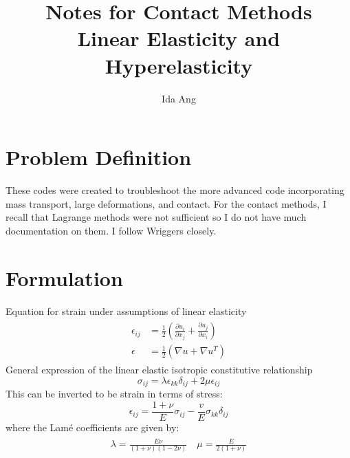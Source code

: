 \documentclass[12pt]{article}
\numberwithin{equation}{section}
\begin{document}
\title{Notes for Contact Methods \\
	\large{Linear Elasticity and Hyperelasticity}}
\author{Ida Ang}
\date{\vspace{-5ex}}
\maketitle

\tableofcontents
\newpage

\section{Problem Definition}
These codes were created to troubleshoot the more advanced code incorporating mass transport, large deformations, and contact. For the contact methods, I recall that Lagrange methods were not sufficient so I do not have much documentation on them. I follow Wriggers closely. 

\section{Formulation}
Equation for strain under assumptions of linear elasticity 
\begin{align}\label{Strain}
\begin{split}
\epsilon_{ij} &= \frac{1}{2} (\frac{\partial u_i}{\partial x_j} + \frac{\partial u_j}{\partial x_i}) \\
\epsilon &= \frac{1}{2} (\nabla u + \nabla u^T)
\end{split}
\end{align}
General expression of the linear elastic isotropic constitutive relationship 
\begin{equation}\label{StressStrain}
\sigma_{ij} = \lambda \epsilon_{kk} \delta_{ij} + 2 \mu \epsilon_{ij}
\end{equation}
This can be inverted to be strain in terms of stress: 
\begin{equation}\label{StrainStress}
\epsilon_{ij} = \frac{1+ \nu}{E} \sigma_{ij} - \frac{v}{E} \sigma_{kk} \delta_{ij}
\end{equation}
where the Lamé coefficients are given by: 
\begin{align}\label{lame}
\begin{split}
\lambda = \frac{E \nu}{(1+ \nu) (1 - 2 \nu)} \quad \mu = \frac{E}{2 (1+ \nu)}
\end{split}
\end{align}
\end{document}
